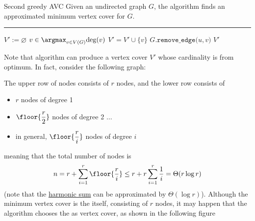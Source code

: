 \documentclass[a4paper, 12pt]{report}
\begin{document}
    \begin{framedalgo}{Second greedy AVC}
        Given an undirected graph $G$, the algorithm finds an approximated minimum vertex cover for $G$. \\
        \hrule

        \quad
        \label{alg:second_greedy_avc}
        \begin{algorithmic}[1]
                \State $V' := \varnothing$
                    \State $v \in \argmax_{v \in V(G)}{\deg(v)}$
                    \State $V' = V' \cup \{v\}$
                     
                        \State $G\texttt{.remove\_edge(}u, v\texttt{)}$
                    \EndFor
                \EndWhile
                \State {} $V'$
            \EndFunction
        \end{algorithmic}
    \end{framedalgo}



    Note that algorithm can produce a vertex cover $V'$ whose cardinality is  from optimum. In fact, consider the following graph: 

    The upper row of nodes consists of $r$ nodes, and the lower row consists of

    \begin{itemize}
        \item $r$ nodes of degree 1
        \item $\floor{\dfrac{r}{2}}$ nodes of degree 2 $\ldots$
        \item in general, $\floor{\dfrac{r}{i}}$ nodes of degree $i$
    \end{itemize}

    meaning that the total number of nodes is $$n = r + \sum_{i = 1}^r{\floor{\dfrac{r}{i}}} \le r + r \sum_{i = 1} ^r{\dfrac{1}{i}} = \Theta(r \log r)$$ (note that the \href{https://en.wikipedia.org/wiki/Harmonic_series_(mathematics)}{harmonic sum} can be approximated by $\Theta(\log r)$). Although the  minimum vertex cover is the  itself, consisting of $r$ nodes, it may happen that the algorithm chooses the  as vertex cover, as shown in the following figure 
\end{document}
